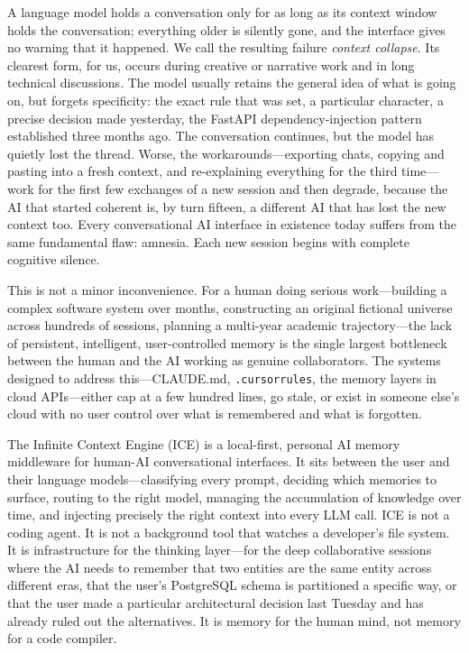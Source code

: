 \documentclass[11pt,a4paper]{article}
\begin{document}
A language model holds a conversation only for as long as its context window holds the conversation; everything older is silently gone, and the interface gives no warning that it happened. We call the resulting failure \emph{context collapse}. Its clearest form, for us, occurs during creative or narrative work and in long technical discussions. The model usually retains the general idea of what is going on, but forgets specificity: the exact rule that was set, a particular character, a precise decision made yesterday, the FastAPI dependency-injection pattern established three months ago. The conversation continues, but the model has quietly lost the thread. Worse, the workarounds---exporting chats, copying and pasting into a fresh context, and re-explaining everything for the third time---work for the first few exchanges of a new session and then degrade, because the AI that started coherent is, by turn fifteen, a different AI that has lost the new context too. Every conversational AI interface in existence today suffers from the same fundamental flaw: amnesia. Each new session begins with complete cognitive silence.

This is not a minor inconvenience. For a human doing serious work---building a complex software system over months, constructing an original fictional universe across hundreds of sessions, planning a multi-year academic trajectory---the lack of persistent, intelligent, user-controlled memory is the single largest bottleneck between the human and the AI working as genuine collaborators. The systems designed to address this---CLAUDE.md, \texttt{.cursorrules}, the memory layers in cloud APIs---either cap at a few hundred lines, go stale, or exist in someone else's cloud with no user control over what is remembered and what is forgotten.

The Infinite Context Engine (ICE) is a local-first, personal AI memory middleware for human-AI conversational interfaces. It sits between the user and their language models---classifying every prompt, deciding which memories to surface, routing to the right model, managing the accumulation of knowledge over time, and injecting precisely the right context into every LLM call. ICE is not a coding agent. It is not a background tool that watches a developer's file system. It is infrastructure for the thinking layer---for the deep collaborative sessions where the AI needs to remember that two entities are the same entity across different eras, that the user's PostgreSQL schema is partitioned a specific way, or that the user made a particular architectural decision last Tuesday and has already ruled out the alternatives. It is memory for the human mind, not memory for a code compiler.
\end{document}
